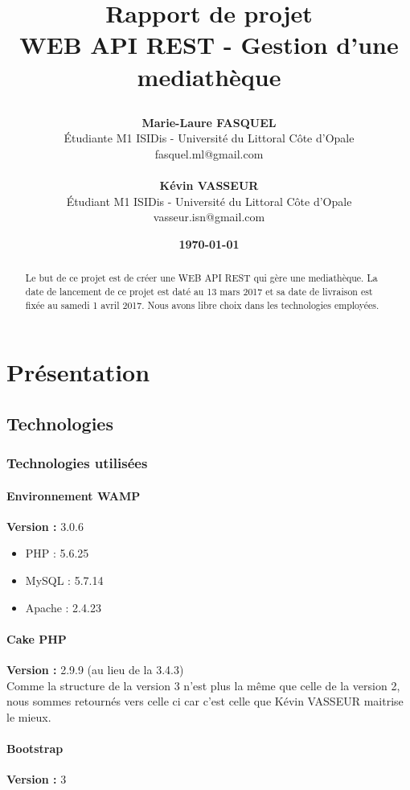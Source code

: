 \documentclass{report}
\title{%
    \begin{minipage}\linewidth
        \centering
        Rapport de projet\\
        \large WEB API REST - Gestion d'une mediath\`{e}que
    \end{minipage}
}
\author{
	\textbf{Marie-Laure FASQUEL} \\
	\'{E}tudiante M1 ISIDis - Universit\'{e} du Littoral C\^{o}te d'Opale\\
	fasquel.ml@gmail.com\\
	\\
	\textbf{K\'{e}vin VASSEUR} \\
	\'{E}tudiant M1 ISIDis - Universit\'{e} du Littoral C\^{o}te d'Opale\\
	vasseur.isn@gmail.com\\
}
\date{\textbf{\today}}
\begin{document}
	\maketitle
	\begin{abstract}
		Le but de ce projet est de cr\'{e}er une WEB API REST qui g\`{e}re une mediath\`{e}que. La date de lancement de ce projet est dat\'{e} au 13 mars 2017 et sa date de livraison est fix\'{e}e au samedi 1 avril 2017. Nous avons libre choix dans les technologies employ\'{e}es. \\
	\end{abstract}
	
	\tableofcontents	
	
	\chapter{Pr\'{e}sentation}
	
	\section{Technologies}
		\subsection{Technologies utilis\'{e}es}
			\subsubsection{Environnement WAMP}
			\textbf{Version :} 3.0.6 \\
			\begin{itemize}
			\item PHP : 5.6.25
			\item MySQL : 5.7.14
			\item Apache : 2.4.23
			\end{itemize}
			
			\subsubsection{Cake PHP}
			\textbf{Version :} 2.9.9 (au lieu de la 3.4.3) \\
			Comme la structure de la version 3 n'est plus la m\^{e}me que celle de la version 2, nous sommes retourn\'{e}s vers celle ci car c'est celle que K\'{e}vin VASSEUR maitrise le mieux.
			\subsubsection{Bootstrap}
			\textbf{Version :} 3 \\		
			
\end{document}
